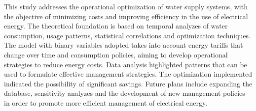 This study addresses the operational optimization of water supply systems, with the objective of minimizing costs and improving efficiency in the use of electrical energy. The theoretical foundation is based on temporal analyzes of water consumption, usage patterns, statistical correlations and optimization techniques. The model with binary variables adopted takes into account energy tariffs that change over time and consumption policies, aiming to develop operational strategies to reduce energy costs. Data analysis highlighted patterns that can be used to formulate effective management strategies. The optimization implemented indicated the possibility of significant savings. Future plans include expanding the database, sensitivity analyzes and the development of new management policies in order to promote more efficient management of electrical energy.

